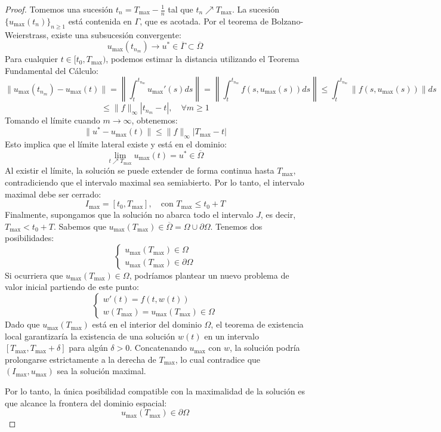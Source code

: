 \begin{proof}
    Tomemos una sucesión $t_n = T_{\text{max}} - \frac{1}{n}$ tal que $t_n \nearrow T_{\text{max}}$. La sucesión $\{ u_{\text{max}}(t_n) \}_{n \geq 1}$ está contenida en $\Gamma$, que es acotada. Por el teorema de Bolzano-Weierstrass, existe una subsucesión convergente:
    \[
        u_{\text{max}}(t_{n_m}) \to u^* \in \overline{\Gamma} \subset \overline{\Omega}
    \]
    Para cualquier $t \in [t_0, T_{\text{max}})$, podemos estimar la distancia utilizando el Teorema Fundamental del Cálculo:
    \[
        \| u_{\text{max}}(t_{n_m}) - u_{\text{max}}(t) \| = \left\| \int_t^{t_{n_m}} u_{\text{max}}'(s) ds \right\| = \left\| \int_t^{t_{n_m}} f(s, u_{\text{max}}(s)) ds \right\| \leq \int_t^{t_{n_m}} \| f(s, u_{\text{max}}(s)) \| ds 
    \]
    \[
        \leq \| f \|_\infty | t_{n_m} - t |, \quad \forall m \geq 1
    \]
    Tomando el límite cuando $m \to \infty$, obtenemos:
    \[
        \| u^* - u_{\text{max}}(t) \| \leq \| f \|_\infty | T_{\text{max}} - t |
    \]
    Esto implica que el límite lateral existe y está en el dominio:
    \[
        \lim_{t \nearrow T_{\text{max}}} u_{\text{max}}(t) = u^* \in \overline{\Omega}
    \]
    Al existir el límite, la solución se puede extender de forma continua hasta $T_{\text{max}}$, contradiciendo que el intervalo maximal sea semiabierto. Por lo tanto, el intervalo maximal debe ser cerrado:
    \[
        I_{\text{max}} = [t_0, T_{\text{max}}], \quad \text{con } T_{\text{max}} \leq t_0 + T
    \]
    Finalmente, supongamos que la solución no abarca todo el intervalo $J$, es decir, $T_{\text{max}} < t_0 + T$. Sabemos que $u_{\text{max}}(T_{\text{max}}) \in \overline{\Omega} = \Omega \cup \partial \Omega$. Tenemos dos posibilidades:
    \[
        \begin{cases}
            u_{\text{max}}(T_{\text{max}}) \in \Omega \\
            u_{\text{max}}(T_{\text{max}}) \in \partial \Omega
        \end{cases}
    \]
    Si ocurriera que $u_{\text{max}}(T_{\text{max}}) \in \Omega$, podríamos plantear un nuevo problema de valor inicial partiendo de este punto:
    \[
        \begin{cases}
            w'(t) = f(t, w(t)) \\
            w(T_{\text{max}}) = u_{\text{max}}(T_{\text{max}}) \in \Omega
        \end{cases}
    \]
    Dado que $u_{\text{max}}(T_{\text{max}})$ está en el interior del dominio $\Omega$, el teorema de existencia local garantizaría la existencia de una solución $w(t)$ en un intervalo $[T_{\text{max}}, T_{\text{max}} + \delta]$ para algún $\delta > 0$. Concatenando $u_{\text{max}}$ con $w$, la solución podría prolongarse estrictamente a la derecha de $T_{\text{max}}$, lo cual contradice que $(I_{\text{max}}, u_{\text{max}})$ sea la solución maximal.
    
    Por lo tanto, la única posibilidad compatible con la maximalidad de la solución es que alcance la frontera del dominio espacial:
    \[
        u_{\text{max}}(T_{\text{max}}) \in \partial \Omega
    \]
\end{proof}
